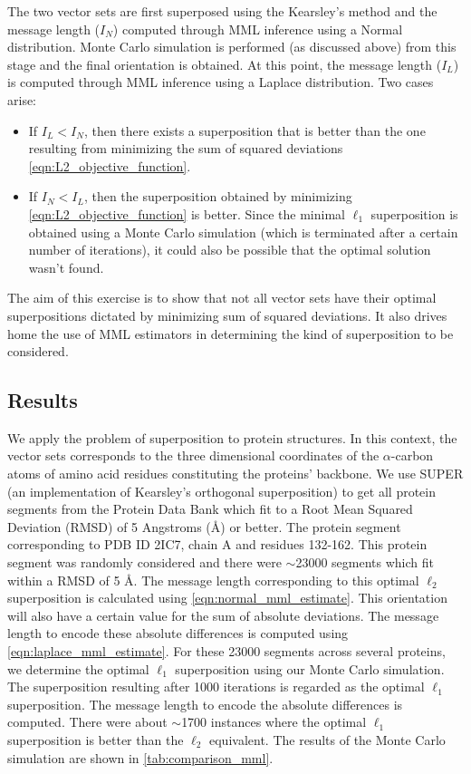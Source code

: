 \documentclass[wcp]{jmlr}
\begin{document}
The two vector sets are first superposed using the Kearsley's method and the message
length ($I_{N}$) computed through MML inference using a Normal distribution. 
Monte Carlo simulation is performed (as discussed above) from this stage and
the final orientation is obtained. At this point, the message length ($I_L$) is
computed through MML inference using a Laplace distribution. Two cases arise:
\begin{itemize}
\item If $I_L < I_N$, then there exists a superposition that is better than the
one resulting from minimizing the sum of squared deviations \eqref{eqn:L2_objective_function}.
\item If $I_N < I_L$, then the superposition obtained by minimizing
\eqref{eqn:L2_objective_function} is better. Since the minimal $\ell_1$ superposition
is obtained using a Monte Carlo simulation (which is terminated after a certain number
of iterations), it could also be possible that the optimal solution wasn't found.
\end{itemize}

The aim of this exercise is to show that not all vector sets have their
optimal superpositions dictated by minimizing sum of squared deviations. It also drives
home the use of MML estimators in determining the kind of superposition to be
considered. 

\subsection*{Results}
We apply the problem of superposition to protein structures. In this context, the vector sets
corresponds to the three dimensional coordinates of the $\alpha$-carbon atoms of 
amino acid residues constituting the proteins' backbone. We use SUPER \citep{super}
(an implementation of Kearsley's orthogonal superposition)
to get all protein segments from the Protein Data Bank which fit to a Root Mean 
Squared Deviation (RMSD) of 5 Angstroms (\AA) or better. The protein segment corresponding
to PDB ID 2IC7, chain A and residues 132-162. This protein segment was randomly
considered and there were $\sim$23000 segments which fit within a RMSD of 5 \AA. 
The message length corresponding to this optimal $\ell_2$ superposition is calculated
using \eqref{eqn:normal_mml_estimate}. This orientation will also have a certain
value for the sum of absolute deviations. The message length to encode these
absolute differences is computed using \eqref{eqn:laplace_mml_estimate}.
For these 23000 segments across several proteins, we determine the optimal $\ell_1$ superposition
using our Monte Carlo simulation. The superposition resulting after 1000 iterations
is regarded as the optimal $\ell_1$ superposition. The message length to encode the
absolute differences is computed. There were about $\sim$1700 instances where the
optimal $\ell_1$ superposition is better than the $\ell_2$ equivalent. 
The results of the Monte Carlo simulation are shown in \autoref{tab:comparison_mml}. 
\end{document}
